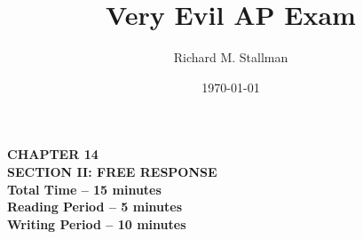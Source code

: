

\setlength{\footskip}{1in}  %

\pagestyle{fancy}



\title{Very Evil AP Exam}
\author{Richard M. Stallman}
\date{\today}
\maketitle





\onecolumn

\begin{adjustwidth}{1in}{1in}
  \begin{center}
    \textbf{
      CHAPTER 14 \\
      \medskip
      SECTION II: FREE RESPONSE \\
      \medskip
      Total Time -- 15 minutes \\
      \medskip
      Reading Period -- 5 minutes \\
      \medskip
      Writing Period -- 10 minutes}
  \end{center}
\end{adjustwidth}

\bigskip


\onecolumn
\sffamily
\bfseries



\large
\printbibliography


